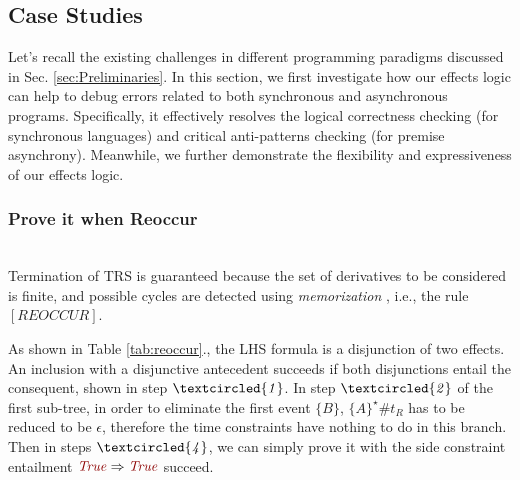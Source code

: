 \documentclass[acmsmall,10pt,review]{acmart}
\newcommand{\effect}{\textcolor{black}{\ensuremath{\mathrm{\Phi}}}}
\newcommand{\code}[1]{{\tt{\ensuremath{\m{#1}}}}}
\newcommand{\CONTAIN}{\sqsubseteq}
\newcommand{\m}{\mathit}
\newcommand\tabref[1]{Table \textcolor{black}{\ref{#1}}.}
\newcommand\secref[1]{Sec. \textcolor{black}{\ref{#1}}}
\begin{document}
{\subsection{Case Studies}
\label{subsec:Case_Studies}

Let's recall the existing challenges in different programming paradigms discussed in \secref{sec:Preliminaries}. In this section, we first investigate how our effects logic can help to debug errors related to both synchronous and asynchronous programs. Specifically, it effectively resolves the logical correctness checking (for synchronous languages) and critical anti-patterns checking (for premise asynchrony). 
Meanwhile, we further demonstrate the flexibility and expressiveness of our effects logic. 










\subsubsection{Prove it when Reoccur}~\\

Termination of TRS is guaranteed because the set of derivatives to be considered is finite, and possible cycles are detected using \emph{memorization} \cite{brotherston2005cyclic}, i.e., the rule \code{[REOCCUR]}. %






As shown in \tabref{tab:reoccur}, the LHS formula is a disjunction of two effects. An inclusion with a disjunctive antecedent succeeds if both disjunctions entail the consequent, shown in step \code{\textcircled{1}}.  
In step \code{\textcircled{2}} of the first sub-tree, in order to eliminate the first event \code{\{B\}}, \code{\{A\}^\star \# t_R} has to be reduced to be \code{\epsilon}, therefore the time constraints have nothing to do in this branch. 
Then in steps \code{\code{\textcircled{4}}}, we
can simply prove it with the side constraint entailment \code{\textcolor {darkred}{True} \Rightarrow  \textcolor {darkred}{True}} succeed.


}
\end{document}
